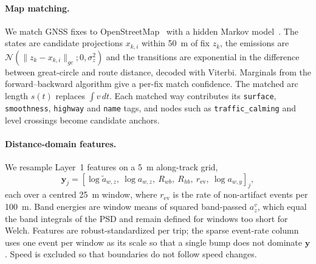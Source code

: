 \paragraph{Map matching.}
We match GNSS fixes to OpenStreetMap~\cite{haklay2008osm} with a hidden Markov model~\cite{newson2009hmm}.
The states are candidate projections $x_{k,i}$ within 50~m of fix $z_k$, the emissions are $\mathcal N(\lVert z_k-x_{k,i}\rVert_{gc};0,\sigma_z^2)$ and the transitions are exponential in the difference between great-circle and route distance, decoded with Viterbi.
Marginals from the forward--backward algorithm give a per-fix match confidence.
The matched arc length $s(t)$ replaces $\int v\,dt$.
Each matched way contributes its \texttt{surface}, \texttt{smoothness}, \texttt{highway} and \texttt{name} tags, and nodes such as \texttt{traffic\_calming} and level crossings become candidate anchors.

\paragraph{Distance-domain features.}
We resample Layer~1 features on a 5~m along-track grid,
\begin{equation}
\mathbf y_j=[\log\tilde a_{w,z},\ \log a_{w,z},\ R_{wb},\ R_{hb},\ r_{\mathrm{ev}},\ \log a_{w,y}]_j ,
\end{equation}
each over a centred 25~m window, where $r_{\mathrm{ev}}$ is the rate of non-artifact events per 100~m.
Band energies are window means of squared band-passed $a^v_z$, which equal the band integrals of the PSD and remain defined for windows too short for Welch.
Features are robust-standardized per trip; the sparse event-rate column uses one event per window as its scale so that a single bump does not dominate $\mathbf y$.
Speed is excluded so that boundaries do not follow speed changes.

